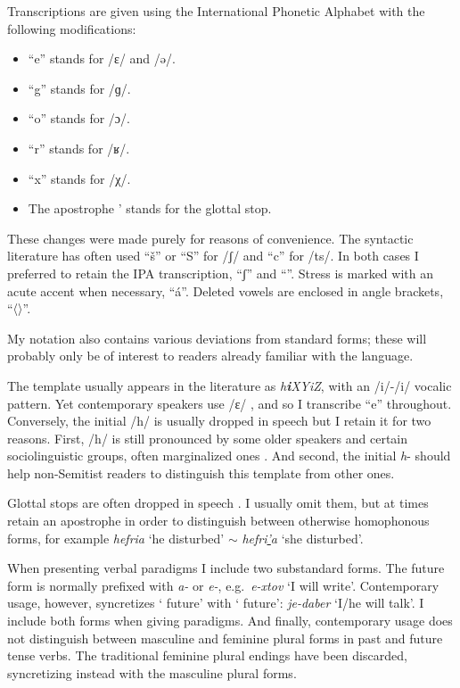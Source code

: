\begin{exe}
\begin{xlist}
\begin{exe}
\begin{exe}
\begin{exe}
\begin{exe}
\begin{xlist}
\begin{exe}
\begin{xlist}
\begin{xlist}
\begin{xlist}
\begin{exe}
\begin{xlist}
Transcriptions are given using the International Phonetic Alphabet with the following modifications:
\begin{itemize}
	\item ``e'' stands for /ɛ/ and /ə/.
	\item ``g'' stands for /ɡ/.
	\item ``o'' stands for /ɔ/.
	\item ``r'' stands for /ʁ/.
	\item ``x'' stands for /χ/.
	\item The apostrophe ' stands for the glottal stop. %
\end{itemize}
These changes were made purely for reasons of convenience. The syntactic literature has often used ``\v{s}'' or ``S'' for /ʃ/ and ``c'' for /ts/. In both cases I preferred to retain the IPA transcription, ``ʃ'' and ``{\ts}''. Stress is marked with an acute accent when necessary, ``\'a''. Deleted vowels are enclosed in angle brackets, ``〈〉''. %

My notation also contains various deviations from standard forms; these will probably only be of interest to readers already familiar with the language.

The template {\thif} usually appears in the literature as \emph{h\textbf{i}XYiZ}, with an /i/-/i/ vocalic pattern. Yet contemporary speakers use /ɛ/ \citep{trachtman16}, and so I transcribe ``e'' throughout. Conversely, the initial /h/ is usually dropped in speech but I retain it for two reasons. First, /h/ is still pronounced by some older speakers and certain sociolinguistic groups, often marginalized ones \citep[cf.~][]{schwarzwald81biu,gafter14phd}. And second, the initial \emph{h}- should help non-Semitist readers to distinguish this template from other ones.

Glottal stops are often dropped in speech \citep{enguehardfaust18}. I usually omit them, but at times retain an apostrophe in order to distinguish between otherwise homophonous forms, for example \emph{hefria} `he disturbed' $\sim$ \emph{hefri\underline{'}a} `she disturbed'.

When presenting verbal paradigms I include two substandard forms. The  future form is normally prefixed with \emph{a-} or \emph{e-}, e.g.~\emph{e-xtov} `I will write'. Contemporary usage, however, syncretizes ` future' with ` future': \emph{je-daber} `I/he will talk'. I include both forms when giving paradigms. And finally, contemporary usage does not distinguish between masculine and feminine plural forms in past and future tense verbs. The traditional feminine plural endings have been discarded, syncretizing instead with the masculine plural forms.


\end{xlist}
\end{exe}
\end{xlist}
\end{xlist}
\end{xlist}
\end{exe}
\end{xlist}
\end{exe}
\end{exe}
\end{exe}
\end{exe}
\end{xlist}
\end{exe}
